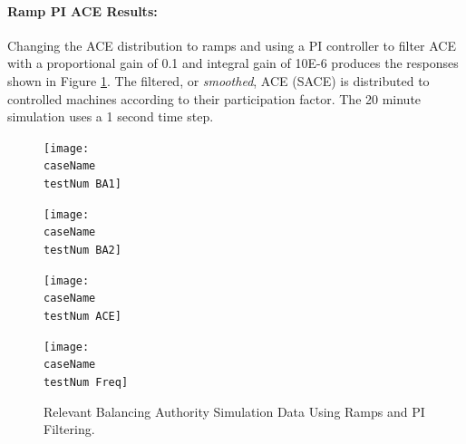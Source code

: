 \documentclass[12pt]{article}
\begin{document}
\paragraph{Ramp PI ACE Results:} Changing the ACE distribution to ramps and using a PI controller to filter ACE with a proportional gain of 0.1 and integral gain of 10E-6 produces the responses shown in Figure \ref{PI 0 Results}. The filtered, or \emph{smoothed}, ACE (SACE) is distributed to controlled machines according to their participation factor. The 20 minute simulation uses a 1 second time step.
\renewcommand{\testNum}{0}
\begin{figure}[h!]
		\centering
		\texttt{[image: \\caseName\\testNum BA1]}\vspace{-1em}
\end{figure}\vspace{-1.5em}
\begin{figure}[h!]
		\centering
		\texttt{[image: \\caseName\\testNum BA2]}\vspace{-1em}
\end{figure}\vspace{-1.5em}
\begin{figure}[h!]
		\centering
		\texttt{[image: \\caseName\\testNum ACE]}\vspace{-1em}
\end{figure}\vspace{-1.5em}
\begin{figure}[h!]
		\centering
		\texttt{[image: \\caseName\\testNum Freq]}\vspace{-1em}
		\caption{Relevant Balancing Authority Simulation Data Using Ramps and PI Filtering.}
		\label{PI 0 Results}		 
\end{figure}\vspace{-1.5em}

\pagebreak
\end{document}
